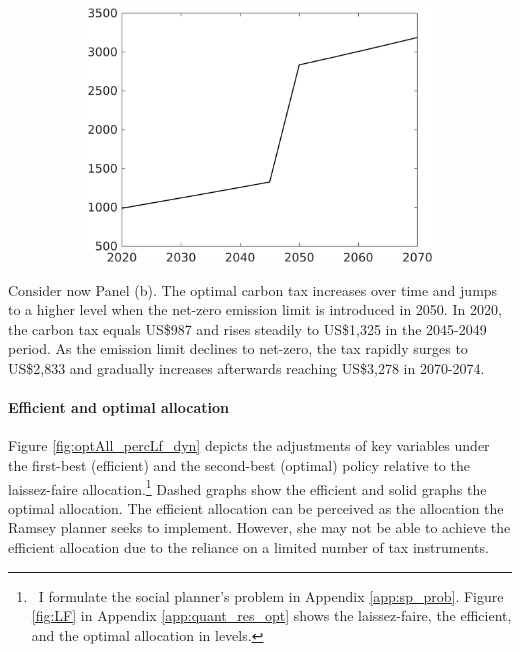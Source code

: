 \begin{figure}[h!!]
\begin{subfigure}{0.4\textwidth}
		\includegraphics[width=1\textwidth]{../../codding_model/own_basedOnFried/optimalPol_010922_revision/figures/all_13Sept22_Tplus30/Single_periods12_OPT_T_NoTaus_Tauf_regime4_spillover0_knspil0_noskill0_sep0_xgrowth0_extern0_PV1_sizeequ0_GOV0_etaa0.79.png}
	\end{subfigure}
\end{figure} 
Consider now Panel (b). The optimal carbon tax increases over time and jumps to a higher level when the net-zero emission limit is introduced in 2050.
In 2020, the carbon tax equals US\$987 and rises steadily to US\$1,325 in the 2045-2049 period.  As the emission limit declines to net-zero, the tax rapidly surges to US\$2,833 and gradually increases afterwards reaching US\$3,278 in 2070-2074. 
\paragraph{Efficient and optimal allocation}\label{subsec:notaul}

Figure \ref{fig:optAll_percLf_dyn} depicts the adjustments of key variables under the first-best (efficient) and the second-best (optimal) policy relative to the laissez-faire allocation.\footnote{\ I formulate the social planner's problem in Appendix \ref{app:sp_prob}.  Figure \ref{fig:LF} in Appendix \ref{app:quant_res_opt} shows the laissez-faire, the efficient, and the optimal allocation in levels.}  Dashed graphs show the efficient and solid graphs the optimal allocation.
The efficient allocation can be perceived as the allocation the Ramsey planner seeks to implement. However, she may not be able to achieve the efficient allocation due to the reliance on a limited number of tax instruments.

